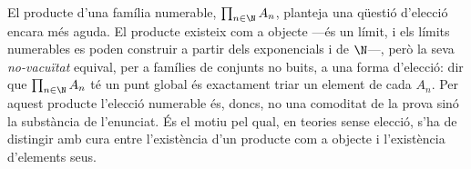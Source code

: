 \begin{observacio}\label{obs:producte-numerable}
El producte d'una família numerable, \(\prod_{n\in\N}A_n\), planteja una
qüestió d'elecció encara més aguda. El producte existeix com a objecte
---és un límit, i els límits numerables es poden construir a partir dels
exponencials i de \(\N\)---, però la seva \emph{no-vacuïtat} equival, per a
famílies de conjunts no buits, a una forma d'elecció: dir que
\(\prod_{n\in\N}A_n\) té un punt global és exactament triar un element de
cada \(A_n\). Per aquest producte l'elecció numerable és, doncs, no una
comoditat de la prova sinó la substància de l'enunciat. És el motiu pel
qual, en teories sense elecció, s'ha de distingir amb cura entre
l'existència d'un producte com a objecte i l'existència d'elements seus.
\end{observacio}

